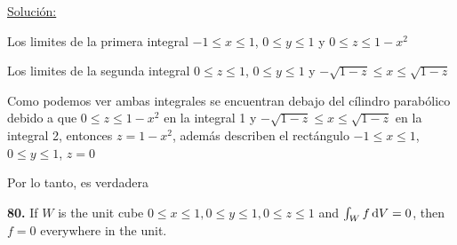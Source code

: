 \documentclass[11pt]{report}
\newcommand{\s}{\underline{Soluci\'{o}n:}}
\begin{document}
\s

Los limites de la primera integral $-1 \leq x \leq 1$, $0 \leq y \leq 1$ y $0 \leq z \leq 1-x^2$

Los limites de la segunda integral $0 \leq z \leq 1$, $0 \leq y \leq 1$ y
$-\sqrt{1-z} \leq x \leq \sqrt{1-z}$

Como podemos ver ambas integrales se encuentran debajo del c\'{i}lindro parab\'{o}lico
debido a que $0 \leq z \leq 1-x^2$ en la integral 1 y $-\sqrt{1-z} \leq x \leq \sqrt{1-z}$
en la integral 2, entonces $z = 1-x^2$, adem\'{a}s describen el rect\'{a}ngulo
$-1 \leq x \leq 1$, $0 \leq y \leq 1$, $z = 0$

Por lo tanto, es verdadera


\textbf{80.} If $W$ is the unit cube $0 \leq x \leq 1, 0 \leq y \leq 1, 0 \leq z \leq 1$
and $ \int _W f \, \text dV = 0$, then $f = 0$ everywhere in the unit. \\
\end{document}
